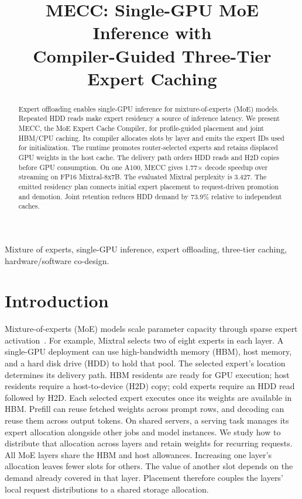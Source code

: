 \documentclass[conference,9pt,letterpaper]{IEEEtran}
\title{MECC: Single-GPU MoE Inference with\protect\\Compiler-Guided Three-Tier Expert Caching}
\author{}
\begin{document}
\maketitle\flushbottom
\begin{abstract}
Expert offloading enables single-GPU inference for mixture-of-experts (MoE) models. Repeated HDD reads make expert residency a source of inference latency. We present MECC, the MoE Expert Cache Compiler, for profile-guided placement and joint HBM/CPU caching. Its compiler allocates slots by layer and emits the expert IDs used for initialization. The runtime promotes router-selected experts and retains displaced GPU weights in the host cache. The delivery path orders HDD reads and H2D copies before GPU consumption. On one A100, MECC gives 1.77$\times$ decode speedup over streaming on FP16 Mixtral-8x7B. The evaluated Mixtral perplexity is 3.427. The emitted residency plan connects initial expert placement to request-driven promotion and demotion. Joint retention reduces HDD demand by 73.9\% relative to independent caches.
\end{abstract}

\begin{IEEEkeywords}
Mixture of experts, single-GPU inference, expert offloading, three-tier caching, hardware/software co-design.
\end{IEEEkeywords}

\section{Introduction}
Mixture-of-experts (MoE) models scale parameter capacity through sparse expert activation~\cite{shazeer,switch,mixtral,deepseekmoe}. For example, Mixtral selects two of eight experts in each layer. A single-GPU deployment can use high-bandwidth memory (HBM), host memory, and a hard disk drive (HDD) to hold that pool. The selected expert's location determines its delivery path. HBM residents are ready for GPU execution; host residents require a host-to-device (H2D) copy; cold experts require an HDD read followed by H2D. Each selected expert executes once its weights are available in HBM. Prefill can reuse fetched weights across prompt rows, and decoding can reuse them across output tokens. On shared servers, a serving task manages its expert allocation alongside other jobs and model instances. We study how to distribute that allocation across layers and retain weights for recurring requests. All MoE layers share the HBM and host allowances. Increasing one layer's allocation leaves fewer slots for others. The value of another slot depends on the demand already covered in that layer. Placement therefore couples the layers' local request distributions to a shared storage allocation.
\end{document}
